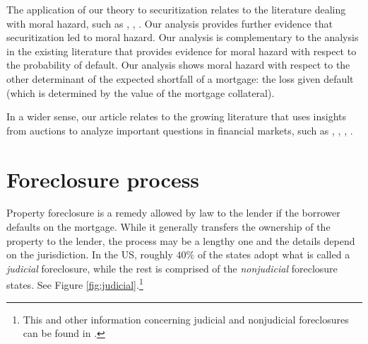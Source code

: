 \documentclass[11pt,twopage]{article}
\begin{document}


The application of our theory to securitization relates to the
literature dealing with moral hazard, such as \cite{mian2009consequences}, \cite{keys2008did},
\cite{tirole2011illiquidity}. Our analysis provides
further evidence that securitization led to moral hazard. Our analysis
is complementary to the analysis in the existing literature that
provides evidence for moral hazard with respect to the probability of
default. Our analysis shows moral hazard with respect to the other
determinant of the expected shortfall of a mortgage: the loss given
default (which is determined by the value of the mortgage collateral).

In a wider sense, our article relates to the growing literature that
uses insights from auctions to analyze important questions in
financial markets, such as \cite{heller1998auctions},
\cite{hortacsu2010mechanism}, \cite{cassola20132007},
\cite{zulehner2013competition}.


\section{Foreclosure process}
Property foreclosure is a remedy allowed by law to the lender if the
borrower defaults on the mortgage. While it generally transfers the
ownership of the property to the lender, the process may be a lengthy
one and the details depend on the jurisdiction. In the US, roughly
$40\%$ of the states adopt what is called a \emph{judicial}
foreclosure, while the rest is comprised of the \emph{nonjudicial}
foreclosure states. See Figure \ref{fig:judicial}.\footnote{This and
  other information concerning judicial and nonjudicial foreclosures
  can be found in \cite{nelson2004reforming}.}
\end{document}
